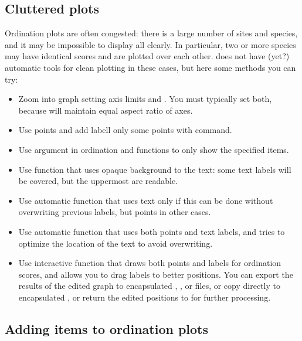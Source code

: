 \documentclass[article,nojss]{jss}
\begin{document}
\subsection{Cluttered plots}

Ordination plots are often congested: there is a large number of sites
and species, and it may be impossible to display all clearly.  In
particular, two or more species may have identical scores and are
plotted over each other.   does not have (yet?)
automatic tools for clean plotting in these cases, but here some
methods you can try:
\begin{itemize}
\item Zoom into graph setting axis limits  and
  .  You must typically set both, because 
  will maintain equal aspect ratio of axes.
\item Use points and add labell only some points with 
  command.
\item Use  argument in ordination  and
   functions to only show the specified items.
\item Use  function that uses opaque background to
  the text: some text labels will be covered, but the uppermost are
  readable.
\item Use automatic  function that uses text only if
  this can be done without overwriting previous labels, but points in
  other cases.
\item Use automatic  function that uses both
  points and text labels, and tries to optimize the location of the
  text to avoid overwriting.
\item Use interactive  function that draws both
  points and labels for ordination scores, and allows you to drag
  labels to better positions. You can export the results of the edited
  graph to encapsulated , ,
   or  files, or copy directly to
  encapsulated , or return the edited positions
  to  for further processing.
\end{itemize}

\subsection{Adding items to ordination plots}
\end{document}
